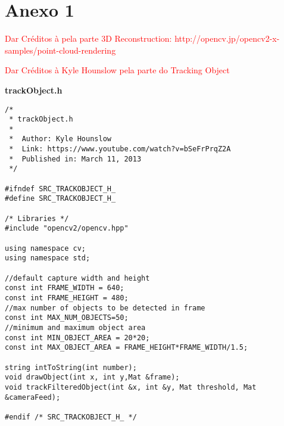 \chapter{Anexo 1}
\label{Anexo1}

\textcolor{red}{Dar Créditos à pela parte 3D Reconstruction: http://opencv.jp/opencv2-x-samples/point-cloud-rendering}

\textcolor{red}{Dar Créditos à Kyle Hounslow pela parte do Tracking Object}

\lstset {language=C++}
\textbf{trackObject.h}
\begin{lstlisting}
/*
 * trackObject.h
 *
 *  Author: Kyle Hounslow
 * 	Link: https://www.youtube.com/watch?v=bSeFrPrqZ2A
 *  Published in: March 11, 2013
 */

#ifndef SRC_TRACKOBJECT_H_
#define SRC_TRACKOBJECT_H_

/* Libraries */
#include "opencv2/opencv.hpp"

using namespace cv;
using namespace std;

//default capture width and height
const int FRAME_WIDTH = 640;
const int FRAME_HEIGHT = 480;
//max number of objects to be detected in frame
const int MAX_NUM_OBJECTS=50;
//minimum and maximum object area
const int MIN_OBJECT_AREA = 20*20;
const int MAX_OBJECT_AREA = FRAME_HEIGHT*FRAME_WIDTH/1.5;

string intToString(int number);
void drawObject(int x, int y,Mat &frame);
void trackFilteredObject(int &x, int &y, Mat threshold, Mat &cameraFeed);

#endif /* SRC_TRACKOBJECT_H_ */
\end{lstlisting}

